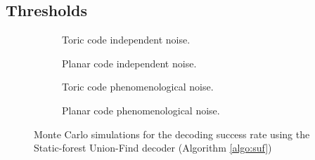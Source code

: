 \subsection{Thresholds}\label{ap:figufthresholds}

\begin{figure}[htbp]
  \centering
  \begin{subfigure}[b]{0.49\textwidth}
      \begin{adjustbox}{Clip=0 1em 0 0}
        
      \end{adjustbox}
      \caption{Toric code independent noise.}
  \end{subfigure}
  \begin{subfigure}[b]{0.49\textwidth}
      \begin{adjustbox}{Clip=0 1em 0 0}
        
      \end{adjustbox}
      \caption{Planar code independent noise.}
  \end{subfigure}
  \begin{subfigure}[b]{0.49\textwidth}
      \begin{adjustbox}{Clip=0 1em 0 0}
        
      \end{adjustbox}
      \caption{Toric code phenomenological noise.}
  \end{subfigure}
  \begin{subfigure}[b]{0.49\textwidth}
      \begin{adjustbox}{Clip=0 1em 0 0}
        
      \end{adjustbox}
      \caption{Planar code phenomenological noise.}
  \end{subfigure}
  \caption{Monte Carlo simulations for the decoding success rate using the Static-forest Union-Find decoder (Algorithm \ref{algo:suf})}
  \label{fig:threshold_suf}
\end{figure}

